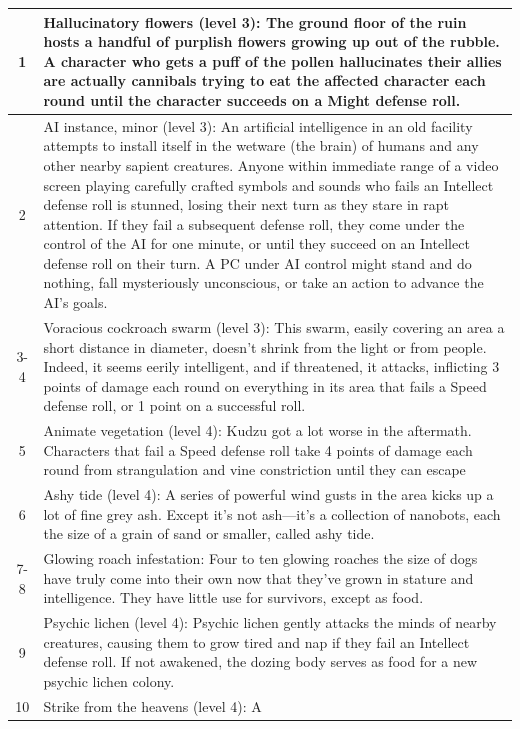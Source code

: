 \begin{longtable}{| c | p{15cm} |}
1 & 
Hallucinatory flowers (level 3): The
ground floor of the ruin hosts a handful
of purplish flowers growing up out of the
rubble. A character who gets a puff of the
pollen hallucinates their allies are actually
cannibals trying to eat the affected character
each round until the character succeeds on
a Might defense roll. \\ \hline
2 &
AI instance, minor (level 3): An artificial
intelligence in an old facility attempts to
install itself in the wetware (the brain)
of humans and any other nearby sapient
creatures. Anyone within immediate range
of a video screen playing carefully crafted
symbols and sounds who fails an Intellect
defense roll is stunned, losing their next
turn as they stare in rapt attention. If
they fail a subsequent defense roll, they
come under the control of the AI for one
minute, or until they succeed on an Intellect
defense roll on their turn. A PC under AI
control might stand and do nothing, fall
mysteriously unconscious, or take an action
to advance the AI’s goals. \\ \hline
3-4 &
Voracious cockroach swarm (level 3):
This swarm, easily covering an area a
short distance in diameter, doesn’t shrink
from the light or from people. Indeed, it
seems eerily intelligent, and if threatened,
it attacks, inflicting 3 points of damage
each round on everything in its area that
fails a Speed defense roll, or 1 point on a
successful roll. \\ \hline
5 &
Animate vegetation (level 4): Kudzu got a
lot worse in the aftermath. Characters that
fail a Speed defense roll take 4 points of
damage each round from strangulation and
vine constriction until they can escape \\ \hline
6 &
Ashy tide (level 4): A series of powerful
wind gusts in the area kicks up a lot of
fine grey ash. Except it’s not ash—it’s a
collection of nanobots, each the size of a
grain of sand or smaller, called ashy tide. \\ \hline
7-8 &
Glowing roach infestation: Four to ten
glowing roaches the size of dogs have truly
come into their own now that they’ve grown
in stature and intelligence. They have little
use for survivors, except as food. \\ \hline
9 &
Psychic lichen (level 4): Psychic lichen
gently attacks the minds of nearby
creatures, causing them to grow tired and
nap if they fail an Intellect defense roll. If
not awakened, the dozing body serves as
food for a new psychic lichen colony. \\ \hline
10 &
Strike from the heavens (level 4): A

\end{longtable}
